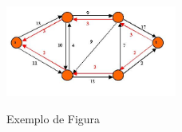 \begin{figure}[!htb]
    \centering
    \caption{Exemplo de Figura}
    \includegraphics[width=0.5\textwidth]{figuras/figura1}
    \label{fig:figura-exemplo1}
\end{figure}